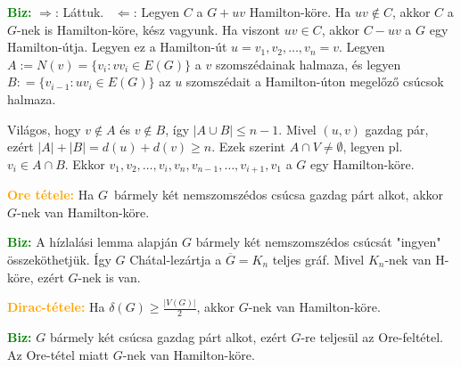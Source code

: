 \documentclass[../../szobeli.tex]{subfiles}
\begin{document}
\begin{itemize}
            \textcolor{green}{\textbf{Biz:}} $\Rightarrow$: Láttuk. \checkmark $\Leftarrow$: Legyen $C$ a $G + uv$ Hamilton-köre. Ha $uv \notin C$, akkor $C$ a $G$-nek is Hamilton-köre, kész vagyunk. Ha viszont $uv \in C$, akkor $C-uv$ a $G$ egy Hamilton-útja. Legyen ez a Hamilton-út $u = v_1, v_2, \dots, v_n = v$. Legyen $A:=N(v) = \{v_i:vv_i \in E(G)\}$ a $v$ szomszédainak halmaza, és legyen $B: = \{v_{i-1} : uv_i \in E(G)\}$ az $u$ szomszédait a Hamilton-úton megelőző csúcsok halmaza.

            Világos, hogy $v \notin A$ és $v \notin B$, így $|A \cup B| \leq n-1$. Mivel $(u,v)$ gazdag pár, ezért $|A|+|B| = d(u)+d(v) \geq n$. Ezek szerint $A \cap V \neq \emptyset$, legyen pl. $v_i \in A \cap B$. Ekkor $v_1, v_2, \dots, v_i, v_n, v_{n-1}, \dots, v_{i+1}, v_1$ a $G$ egy Hamilton-köre. 

            \textcolor{orange}{\textbf{Ore tétele:}} Ha $G$ bármely két nemszomszédos csúcsa gazdag párt alkot, akkor $G$-nek van Hamilton-köre.

            \textcolor{green}{\textbf{Biz:}} A hízlalási lemma alapján $G$ bármely két nemszomszédos csúcsát "ingyen" összeköthetjük. Így $G$ Chátal-lezártja a $\overline{G} = K_n$ teljes gráf. Mivel $K_n$-nek van H-köre, ezért $G$-nek is van. 

            \textcolor{orange}{\textbf{Dirac-tétele:}} Ha $\delta(G) \geq \frac{|V(G)|}{2}$, akkor $G$-nek van Hamilton-köre.

            \textcolor{green}{\textbf{Biz:}} $G$ bármely két csúcsa gazdag párt alkot, ezért $G$-re teljesül az Ore-feltétel. Az Ore-tétel miatt $G$-nek van Hamilton-köre. 

    \end{itemize}
\end{document}
